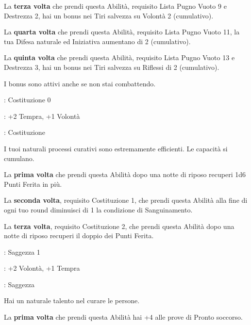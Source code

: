 \begin{multicols}{2}
La \textbf{terza volta} che prendi questa Abilità, requisito Lista Pugno Vuoto 9 e Destrezza 2, hai un bonus nei Tiri salvezza su Volontà 2 (cumulativo).

La \textbf{quarta volta} che prendi questa Abilità, requisito Lista Pugno Vuoto 11, la tua Difesa naturale ed Iniziativa aumentano di 2 (cumulativo).

La \textbf{quinta volta} che prendi questa Abilità, requisito Lista Pugno Vuoto 13 e Destrezza 3, hai un bonus nei Tiri salvezza su Riflessi di 2 (cumulativo).

I bonus sono attivi anche se non stai combattendo.

\begin{description}[noitemsep, topsep=0pt, parsep=0pt, partopsep=0pt, leftmargin=0cm, labelwidth=2.5cm]
    \item[\textbf{Requisito}]: Costituzione 0
    \item[\textbf{Tiri Salvezza}]: +2 Tempra, +1 Volontà
    \item[\textbf{Caratteristica}]: Costituzione
\end{description}

I tuoi naturali processi curativi sono estremamente efficienti. Le capacità si cumulano.

La \textbf{prima volta} che prendi questa Abilità dopo una notte di riposo recuperi 1d6 Punti Ferita in più.

La \textbf{seconda volta}, requisito Costituzione 1,  che prendi questa Abilità alla fine di ogni tuo round diminuisci di 1 la condizione di Sanguinamento.

La \textbf{terza volta}, requisito Costituzione 2, che prendi questa Abilità dopo una notte di riposo recuperi il doppio dei Punti Ferita.

\begin{description}[noitemsep, topsep=0pt, parsep=0pt, partopsep=0pt, leftmargin=0cm, labelwidth=2.5cm]
    \item[\textbf{Requisito}]: Saggezza 1
    \item[\textbf{Tiri Salvezza}]: +2 Volontà, +1 Tempra
    \item[\textbf{Caratteristica}]: Saggezza
\end{description}

Hai un naturale talento nel curare le persone.

La \textbf{prima volta} che prendi questa Abilità hai +4 alle prove di Pronto soccorso.


\end{multicols}
